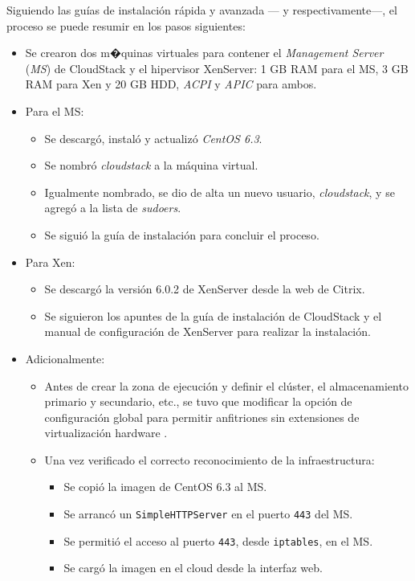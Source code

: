 Siguiendo las gu\'ias de instalaci\'on r\'apida y avanzada ---\cite{cloudstackquickinstall} y \cite{cloudstackadvinstall} res\-pec\-ti\-va\-men\-te---, el proceso se puede resumir en los pasos siguientes:

\begin{itemize}
 \item Se crearon dos m�quinas virtuales para contener el \emph{Management Server} (\emph{MS}) de CloudStack y el hipervisor XenServer: 1 GB RAM para el MS, 3 GB RAM para Xen y 20 GB HDD, \emph{ACPI} y \emph{APIC} para ambos.
 \item Para el MS:
  \begin{itemize}
      \item Se descarg\'o, instal\'o y actualiz\'o \emph{CentOS 6.3}.
   \item Se nombr\'o \emph{cloudstack} a la m\'aquina virtual.
   \item Igualmente nombrado, se dio de alta un nuevo usuario, \emph{cloudstack}, y se agreg\'o a la lista de \emph{sudoers}.
   \item Se sigui\'o la gu\'ia de instalaci\'on \cite{cloudstackquickinstall} para concluir el proceso.
  \end{itemize}
 \item Para Xen:
  \begin{itemize}
   \item Se descarg\'o la versi\'on 6.0.2 de XenServer desde la web de Citrix.
   \item Se siguieron los apuntes de la gu\'ia de instalaci\'on de CloudStack \cite{cloudstackquickinstall} y el manual de configuraci\'on de XenServer \cite{xenserverinstall} para realizar la instalaci\'on.
  \end{itemize}
 \item Adicionalmente:
  \begin{itemize}
   \item Antes de crear la zona de ejecuci\'on y definir el cl\'uster, el almacenamiento primario y secundario, etc., se tuvo que modificar la opci\'on de configuraci\'on global para permitir anfitriones sin extensiones de virtualizaci\'on hardware \cite{cloudstacknohvm}.
   \item Una vez verificado el correcto reconocimiento de la infraestructura:
    \begin{itemize}
     \item Se copi\'o la imagen de CentOS 6.3 al MS.
     \item Se arranc\'o un \texttt{SimpleHTTPServer} en el puerto \texttt{443} del MS.
     \item Se permiti\'o el acceso al puerto \texttt{443}, desde \texttt{iptables}, en el MS.
     \item Se carg\'o la imagen en el cloud desde la interfaz web.
    \end{itemize}
  \end{itemize}
\end{itemize}


